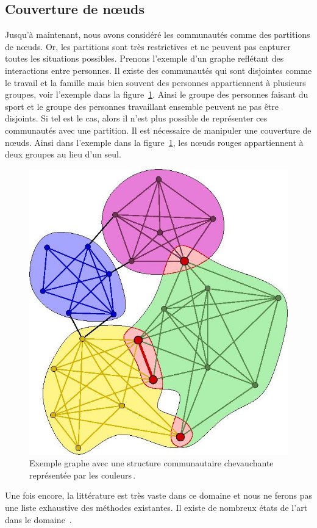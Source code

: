 
\subsection{Couverture de n\oe{}uds}
\label{subsec:cover}
Jusqu'à maintenant, nous avons considéré les communautés comme des partitions de n\oe{}uds.
Or, les partitions sont très restrictives et ne peuvent pas capturer toutes les situations possibles.
Prenons l'exemple d'un graphe reflétant des interactions entre personnes.
Il existe des communautés qui sont disjointes comme le travail et la famille mais bien souvent des personnes appartiennent à plusieurs groupes, voir l'exemple dans la figure~\ref{fig:ex_overlap_communaute}.
Ainsi le groupe des personnes faisant du sport et le groupe des personnes travaillant ensemble peuvent ne pas être disjoints.
Si tel est le cas, alors il n'est plus possible de représenter ces communautés avec une partition.
Il est nécessaire de manipuler une couverture de n\oe{}uds.
Ainsi dans l'exemple dans la figure~\ref{fig:ex_overlap_communaute}, les n\oe{}uds rouges appartiennent à deux groupes au lieu d'un seul.

\begin{figure}
	\centering
	\includegraphics[width=0.31\linewidth]{img/Intro/Illustration_of_overlapping_communities.jpg}
	\caption{Exemple graphe avec une structure communautaire chevauchante représentée par les couleurs\,\protect\footnotemark.}
	\label{fig:ex_overlap_communaute}
\end{figure}

Une fois encore, la littérature est très vaste dans ce domaine et nous ne ferons pas une liste exhaustive des méthodes existantes.
Il existe de nombreux états de l'art dans le domaine~\cite{ Kanawati2014, Xie2013,Bandyopadhyay2015, Hric2014a}.

